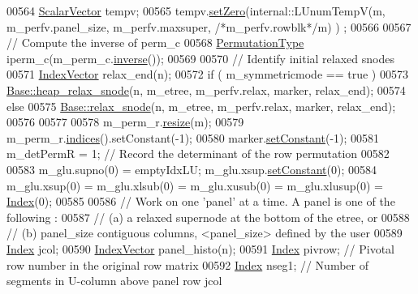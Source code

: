 \begin{DoxyCode}
00564   \hyperlink{group___core___module}{ScalarVector} tempv; 
00565   tempv.\hyperlink{class_eigen_1_1_plain_object_base_ac21ad5f989f320e46958b75ac8d9a1da}{setZero}(internal::LUnumTempV(m, m\_perfv.panel\_size, m\_perfv.maxsuper, \textcolor{comment}{/*m\_perfv.rowblk*/}m) )
      ;
00566   
00567   \textcolor{comment}{// Compute the inverse of perm\_c}
00568   \hyperlink{group___core___module}{PermutationType} iperm\_c(m\_perm\_c.\hyperlink{group___core___module_adb9af427f317202366c2832876064eb3}{inverse}()); 
00569   
00570   \textcolor{comment}{// Identify initial relaxed snodes}
00571   \hyperlink{group___core___module}{IndexVector} relax\_end(n);
00572   \textcolor{keywordflow}{if} ( m\_symmetricmode == \textcolor{keyword}{true} ) 
00573     \hyperlink{group___sparse_l_u___module_a88952ce33c968374b149e31d0539178d}{Base::heap\_relax\_snode}(n, m\_etree, m\_perfv.relax, marker, relax\_end);
00574   \textcolor{keywordflow}{else}
00575     \hyperlink{group___sparse_l_u___module_a33672df380f94e774c5a6919d3474af4}{Base::relax\_snode}(n, m\_etree, m\_perfv.relax, marker, relax\_end);
00576   
00577   
00578   m\_perm\_r.\hyperlink{group___core___module_a0e0fda6e84d69e02432e4770359bb532}{resize}(m); 
00579   m\_perm\_r.\hyperlink{group___core___module_a2f1ab379207fcd1ceb33941e25cf50c2}{indices}().setConstant(-1);
00580   marker.\hyperlink{class_eigen_1_1_plain_object_base_ac8dea1df3d92b752cc683ff42abf6f9b}{setConstant}(-1);
00581   m\_detPermR = 1; \textcolor{comment}{// Record the determinant of the row permutation}
00582   
00583   m\_glu.supno(0) = emptyIdxLU; m\_glu.xsup.\hyperlink{class_eigen_1_1_plain_object_base_ac8dea1df3d92b752cc683ff42abf6f9b}{setConstant}(0);
00584   m\_glu.xsup(0) = m\_glu.xlsub(0) = m\_glu.xusub(0) = m\_glu.xlusup(0) = \hyperlink{namespace_eigen_a62e77e0933482dafde8fe197d9a2cfde}{Index}(0);
00585   
00586   \textcolor{comment}{// Work on one 'panel' at a time. A panel is one of the following :}
00587   \textcolor{comment}{//  (a) a relaxed supernode at the bottom of the etree, or}
00588   \textcolor{comment}{//  (b) panel\_size contiguous columns, <panel\_size> defined by the user}
00589   \hyperlink{namespace_eigen_a62e77e0933482dafde8fe197d9a2cfde}{Index} jcol; 
00590   \hyperlink{group___core___module}{IndexVector} panel\_histo(n);
00591   \hyperlink{namespace_eigen_a62e77e0933482dafde8fe197d9a2cfde}{Index} pivrow; \textcolor{comment}{// Pivotal row number in the original row matrix}
00592   \hyperlink{namespace_eigen_a62e77e0933482dafde8fe197d9a2cfde}{Index} nseg1; \textcolor{comment}{// Number of segments in U-column above panel row jcol}

\end{DoxyCode}
